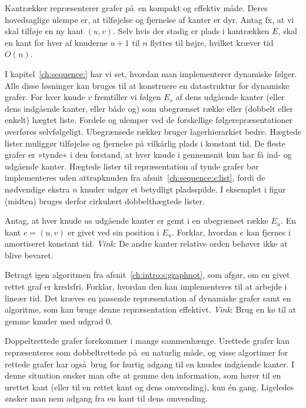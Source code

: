 Kantrækker repræsenterer grafer på en kompakt og effektiv måde.
Deres hovedsaglige ulempe er, at tilføjelse og fjernelse af kanter er dyr.
Antag fx, at vi skal tilføje en ny kant $(u,v)$.
Selv hvis der stadig er plads i kantrækken $E$, skal en kant for hver af knuderne $u+1$ til $n$ flyttes til højre, hvilket kræver tid $O(n)$.

I kapitel~\ref{ch:sequence:} har vi set, hvordan man implementerer dynamiske følger.
Alle disse løsninger kan bruges til at konstruere en datastruktur for dynamiske grafer.
For hver knude $v$ fremtiller vi følgen $E_v$ af dens udgående kanter (eller dens indgående kanter, eller både og) som ubegrænset række  eller (dobbelt eller enkelt) hægtet liste.
Fordele og ulemper ved de forskellige følge\-repræsentationer overføres selvfølgeligt. 
Ubegrænsede rækker bruger lagerhierarkiet bedre.
Hægtede lister muliggør tilføjelse og fjernelse på vilkårlig plads i konstant tid.
De fleste grafer er »tynde«
i den forstand, at hver knude i gennemsnit kun har få ind- og udgående kanter. 
Hægtede lister til repræsentation af tynde grafer bør implementeres uden attrapknuden
fra afsnit~\ref{ch:sequence:s:list},
fordi de nødvendige ekstra $n$ knuder udgør et betydligt pladsspilde.
I eksemplet i figur~ (midten) bruges derfor cirkulært dobbelthægtede lister.  


\begin{exerc}
  Antag, at hver knude $u$s udgående kanter er gemt i en ubegrænset række $E_u$.
  En kant $e=(u,v)$ er givet ved sin position i $E_u$.
  Forklar, hvordan $e$ kan fjernes i amortiseret konstant tid.
  \emph{Vink}: De andre kanter relative orden behøver ikke at blive bevaret.
\end{exerc}


\begin{exerc}
  Betragt igen algoritmen fra afsnit~\ref{ch:intro:s:graphnot}, som afgør, om en givet rettet graf er kredsfri.
  Forklar, hvordan den kan implementeres til at arbejde i lineær tid.
  Det kræves en passende repræsentation af dynamiske grafer samt en algoritme, som kan bruge denne repræsentation effektivt.
  \emph{Vink}:
  Brug en kø til at gemme knuder med udgrad $0$.
\end{exerc}


Doppeltrettede 
grafer forekommer i mange sammenhænge. 
Urettede grafer kan repræsenteres som dobbeltrettede på en naturlig måde, og visse algortimer for rettede grafer har også brug for hurtig adgang til en knudes indgående kanter.
I denne situation ønsker man ofte at gemme den information, som hører til en urettet kant (eller til en rettet kant og dens omvending), kun én gang.
Ligeledes ønsker man nem adgang fra en kant til dens omvending.

